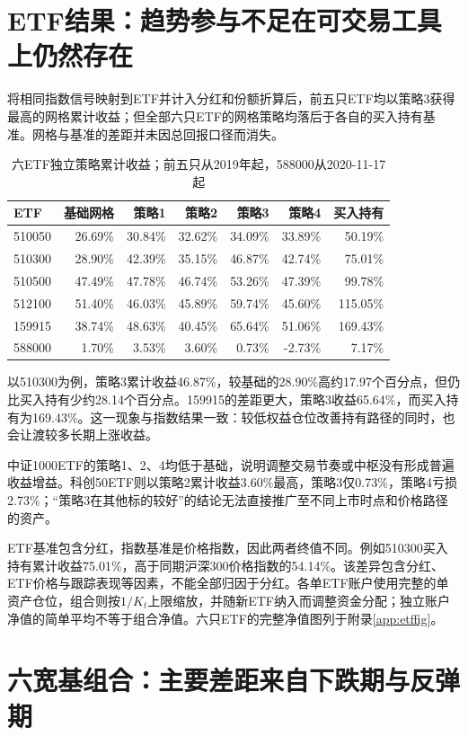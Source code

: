 \documentclass[UTF8,a4paper,11pt,fontset=fandol]{ctexart}
\begin{document}
\clearpage
\section{ETF结果：趋势参与不足在可交易工具上仍然存在}
将相同指数信号映射到ETF并计入分红和份额折算后，前五只ETF均以策略3获得最高的网格累计收益；但全部六只ETF的网格策略均落后于各自的买入持有基准。网格与基准的差距并未因总回报口径而消失。
\begin{table}[htbp]\centering\small
\caption{六ETF独立策略累计收益；前五只从2019年起，588000从2020-11-17起}
\begin{tabular}{lrrrrrr}\toprule
ETF & 基础网格 & 策略1 & 策略2 & 策略3 & 策略4 & 买入持有\\\midrule
510050 & 26.69\% & 30.84\% & 32.62\% & 34.09\% & 33.89\% & 50.19\%\\
510300 & 28.90\% & 42.39\% & 35.15\% & 46.87\% & 42.74\% & 75.01\%\\
510500 & 47.49\% & 47.78\% & 46.74\% & 53.26\% & 47.39\% & 99.78\%\\
512100 & 51.40\% & 46.03\% & 45.89\% & 59.74\% & 45.60\% & 115.05\%\\
159915 & 38.74\% & 48.63\% & 40.45\% & 65.64\% & 51.06\% & 169.43\%\\
588000 & 1.70\% & 3.53\% & 3.60\% & 0.73\% & -2.73\% & 7.17\%\\\bottomrule
\end{tabular}
\end{table}

以510300为例，策略3累计收益46.87\%，较基础的28.90\%高约17.97个百分点，但仍比买入持有少约28.14个百分点。159915的差距更大，策略3收益65.64\%，而买入持有为169.43\%。这一现象与指数结果一致：较低权益仓位改善持有路径的同时，也会让渡较多长期上涨收益。

中证1000ETF的策略1、2、4均低于基础，说明调整交易节奏或中枢没有形成普遍收益增益。科创50ETF则以策略2累计收益3.60\%最高，策略3仅0.73\%，策略4亏损2.73\%；“策略3在其他标的较好”的结论无法直接推广至不同上市时点和价格路径的资产。

ETF基准包含分红，指数基准是价格指数，因此两者终值不同。例如510300买入持有累计收益75.01\%，高于同期沪深300价格指数的54.14\%。该差异包含分红、ETF价格与跟踪表现等因素，不能全部归因于分红。各单ETF账户使用完整的单资产仓位，组合则按$1/K_t$上限缩放，并随新ETF纳入而调整资金分配；独立账户净值的简单平均不等于组合净值。六只ETF的完整净值图列于附录\ref{app:etffig}。

\section{六宽基组合：主要差距来自下跌期与反弹期}
\end{document}

